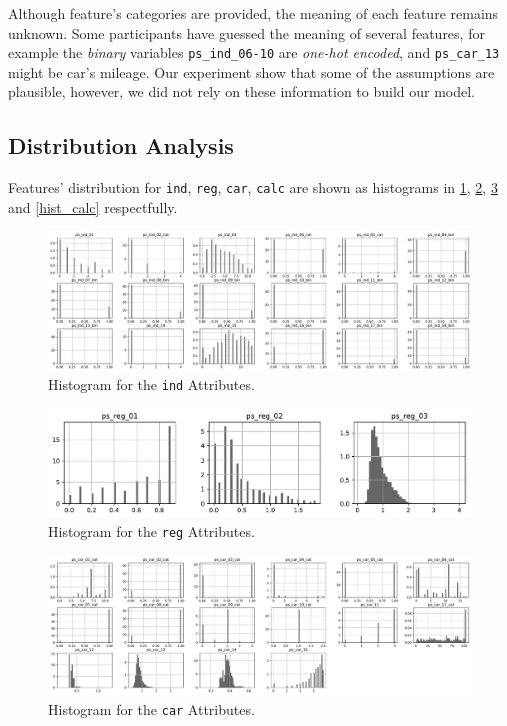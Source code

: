 \documentclass{standalone}
\begin{document}
Although feature's categories are provided, the meaning of each feature remains unknown. Some participants have guessed the meaning of several features, for example the \emph{binary} variables  \lstinline{ps_ind_06-10} are \emph{one-hot encoded}, and \lstinline{ps_car_13} might be car's mileage.
Our experiment show that some of the assumptions are plausible, however, we did not rely on these information to build our model.

\subsection{Distribution Analysis}

Features' distribution for \lstinline{ind}, \lstinline{reg}, \lstinline{car}, \lstinline{calc} are shown as histograms in \cref{hist_ind}, \cref{hist_reg}, \cref{hist_car} and \cref{hist_calc} respectfully.

\begin{figure}[!htb]
\centering
\includegraphics[width=\textwidth]{fig/ind_col.pdf}
\caption{Histogram for the \lstinline{ind} Attributes.}
\label{hist_ind}
\end{figure}

\begin{figure}[!ht]
\centering
\includegraphics[width=.5\textwidth]{fig/reg_col.pdf}
\caption{Histogram for the \lstinline{reg} Attributes.}
\label{hist_reg}
\end{figure}

\begin{figure}[!ht]
\centering
\includegraphics[width=\textwidth]{fig/car_col.pdf}
\caption{Histogram for the \lstinline{car} Attributes.}
\label{hist_car}
\end{figure}
\end{document}
